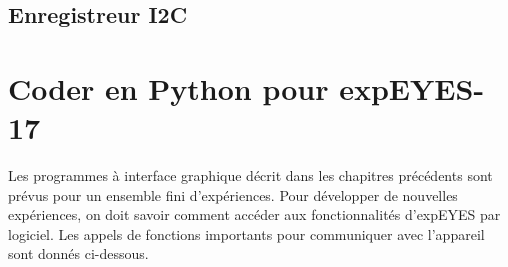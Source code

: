 \documentclass[a4paper,12pt,french]{sphinxmanual}
\begin{document}
\section{Enregistreur I2C}
\label{\detokenize{8.4:enregistreur-i2c}}\label{\detokenize{8.4::doc}}

\chapter{Coder en Python pour expEYES-17}
\label{\detokenize{index:coder-en-python-pour-expeyes-17}}
Les programmes à interface graphique décrit dans les chapitres
précédents sont prévus pour un ensemble fini d’expériences. Pour
développer de nouvelles expériences, on doit savoir comment accéder
aux fonctionnalités d’expEYES par logiciel. Les appels de fonctions
importants pour communiquer avec l’appareil sont donnés ci-dessous.



\renewcommand{\indexname}{Index}
\printindex
\end{document}
